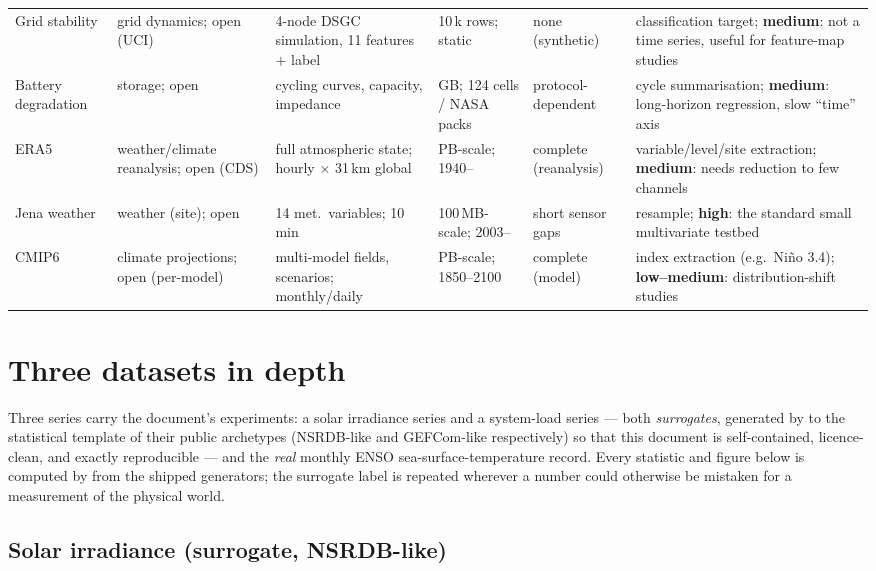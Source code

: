 \begin{table}[tp]
\begin{tabular}{@{}p{2.5cm}p{1.5cm}p{3.1cm}p{2.2cm}p{2.3cm}p{3.4cm}@{}}
Grid stability \citep{arzamasov2018towards} & grid dynamics; open (UCI) & 4-node DSGC simulation, 11 features $+$ label & 10\,k rows; static & none (synthetic) & classification target; \textbf{medium}: not a time series, useful for feature-map studies \\
Battery degradation \citep{severson2019data,saha2007battery} & storage; open & cycling curves, capacity, impedance & GB; 124 cells / NASA packs & protocol-dependent & cycle summarisation; \textbf{medium}: long-horizon regression, slow ``time'' axis \\
ERA5 \citep{hersbach2020era5} & weather/climate reanalysis; open (CDS) & full atmospheric state; hourly $\times$ 31\,km global & PB-scale; 1940-- & complete (reanalysis) & variable/level/site extraction; \textbf{medium}: needs reduction to few channels \\
Jena weather \citep{jena2026weather} & weather (site); open & 14 met.\ variables; 10\,min & 100\,MB-scale; 2003-- & short sensor gaps & resample; \textbf{high}: the standard small multivariate testbed \\
CMIP6 \citep{eyring2016cmip6} & climate projections; open (per-model) & multi-model fields, scenarios; monthly/daily & PB-scale; 1850--2100 & complete (model) & index extraction (e.g.\ Ni\~no 3.4); \textbf{low--medium}: distribution-shift studies \\
\bottomrule
\end{tabular}
\end{table}

\section{Three datasets in depth}
\label{sec:deep-dives}

Three series carry the document's experiments: a solar irradiance series and
a system-load series --- both \emph{surrogates}, generated by
 to the statistical template of their public archetypes
(NSRDB-like and GEFCom-like respectively) so that this document is
self-contained, licence-clean, and exactly reproducible --- and the \emph{real}
monthly ENSO sea-surface-temperature record. Every statistic and figure below
is computed by  from the shipped generators; the surrogate label
is repeated wherever a number could otherwise be mistaken for a measurement
of the physical world.

\subsection{Solar irradiance (surrogate, NSRDB-like)}
\label{sec:solar-dive}

